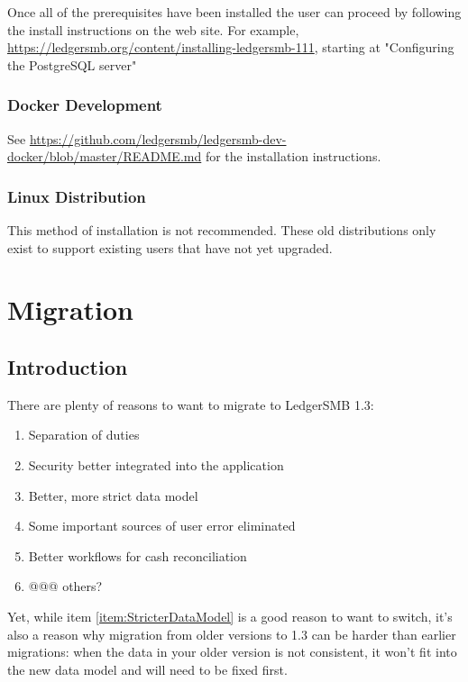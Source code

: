 Once all of the prerequisites have been installed the user can proceed by following the install instructions on the web site.
For example, \url{https://ledgersmb.org/content/installing-ledgersmb-111}, starting at "Configuring the PostgreSQL server"

\subsection{Docker Development}
\label{sub-installation-docker-development}

See \url{https://github.com/ledgersmb/ledgersmb-dev-docker/blob/master/README.md} for the installation instructions.

\subsection{ Linux Distribution}
\label{sub-installation-linux-distribution}

This method of installation is not recommended. These old distributions only exist to support existing users that have not yet upgraded.

\chapter{Migration}
\label{app-migration}

\section{Introduction}
\label{sec-migration-introduction}

There are plenty of reasons to want to migrate to LedgerSMB 1.3:

\begin{enumerate}
\item Separation of duties
\item Security better integrated into the application
\item Better, more strict data model
\label{item:StricterDataModel}
\item Some important sources of user error eliminated
\item Better workflows for cash reconciliation
\item @@@ others?
\end{enumerate}

Yet, while item \ref{item:StricterDataModel} is a good reason to want to switch, it's
also a reason why migration from older versions to 1.3 can be harder than earlier
migrations: when the data
in your older version is not consistent, it won't fit into the new data model and
will need to be fixed first.

